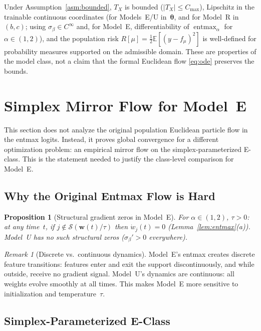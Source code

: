 \documentclass[11pt,a4paper]{article}
\newtheorem{proposition}[theorem]{Proposition}
\theoremstyle{definition}
\theoremstyle{remark}
\newtheorem{remark}[theorem]{Remark}
\newcommand{\E}{\mathbb{E}}
\newcommand{\cS}{\mathcal{S}}
\newcommand{\vtheta}{\boldsymbol{\theta}}
\newcommand{\vw}{\mathbf{w}}
\newcommand{\entmax}{\operatorname{entmax}}
\begin{document}
Under Assumption~\ref{asm:bounded},
$T_X$ is bounded
($|T_X| \le C_{\max}$),
Lipschitz in the trainable continuous
coordinates
(for Models~E/U in~\(\vtheta\), and for
Model~R in~\((b,c)\); using
$\sigma_\beta \in C^\infty$ and, for
Model~E, differentiability of
$\entmax_\alpha$ for $\alpha \in (1,2)$),
and the population risk
$R[\mu] = \frac{1}{2}\E[(y-f_\mu)^2]$
is well-defined for probability measures
supported on the admissible domain. These are
properties of the model class, not a claim that
the formal Euclidean flow \eqref{eq:ode}
preserves the bounds.


\section{Simplex Mirror Flow for Model~E}
\label{sec:convergence}

This section does not analyze the original
population Euclidean particle flow in the
entmax logits. Instead, it proves global
convergence for a different optimization
problem: an empirical mirror flow on the
simplex-parameterized E-class.
This is the statement needed to justify the
class-level comparison for Model~E.

\subsection{Why the Original Entmax Flow is Hard}

\begin{proposition}[Structural gradient zeros
  in Model~E]
  \label{prop:structural-zeros}
  For $\alpha \in (1,2)$, $\tau > 0$:
  at any time~$t$, if
  $j \notin \cS(\vw(t)/\tau)$ then
  $\dot{w}_j(t) = 0$
  (Lemma~\ref{lem:entmax}(a)).
  Model~U has no such structural zeros
  ($\sigma_\beta' > 0$ everywhere).
\end{proposition}

\begin{remark}[Discrete vs.\ continuous dynamics]
  Model~E's entmax creates discrete feature
  transitions: features enter and exit the
  support discontinuously, and while outside,
  receive no gradient signal.
  Model~U's dynamics are continuous:
  all weights evolve smoothly at all times.
  This makes Model~E more sensitive to
  initialization and temperature~$\tau$.
\end{remark}


\subsection{Simplex-Parameterized E-Class}
\end{document}
